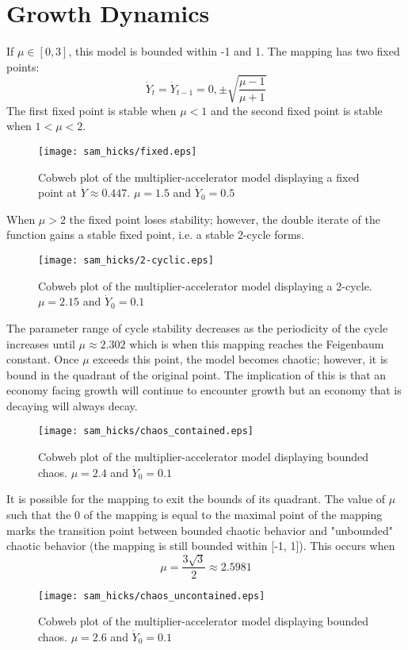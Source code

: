 \section{Growth Dynamics}
If $\mu\in[0,3]$, this model is bounded within -1 and 1. The mapping has two fixed points:
\begin{equation}
    \dot Y_t=\dot Y_{t-1}=0,\pm\sqrt{\frac{\mu-1}{\mu+1}}
\end{equation}
The first fixed point is stable when $\mu<1$ and the second fixed point is stable when $1<\mu<2$.
\begin{figure}
    \centering
    \texttt{[image: sam\_hicks/fixed.eps]}
    \caption{Cobweb plot of the multiplier-accelerator model displaying a fixed point at $\dot Y\approx0.447$. $\mu=1.5$ and $\dot Y_0=0.5$}
    \label{mult_fixed}
\end{figure}

When $\mu>2$ the fixed point loses stability; however, the double iterate of the function gains a stable fixed point, i.e. a stable 2-cycle forms. 

\begin{figure}
    \centering
    \texttt{[image: sam\_hicks/2-cyclic.eps]}
    \caption{Cobweb plot of the multiplier-accelerator model displaying a 2-cycle. $\mu=2.15$ and $\dot Y_0=0.1$}
    \label{mult_2-cycle}
\end{figure}
The parameter range of cycle stability decreases as the periodicity of the cycle increases until $\mu\approx2.302$ which is when this mapping reaches the Feigenbaum constant. Once $\mu$ exceeds this point, the model becomes chaotic; however, it is bound in the quadrant of the original point. The implication of this is that an economy facing growth will continue to encounter growth but an economy that is decaying will always decay.
\begin{figure}
    \centering
    \texttt{[image: sam\_hicks/chaos\_contained.eps]}
    \caption{Cobweb plot of the multiplier-accelerator model displaying bounded chaos. $\mu=2.4$ and $\dot Y_0=0.1$}
    \label{mult_bounded-chaos}
\end{figure}
It is possible for the mapping to exit the bounds of its quadrant. The value of $\mu$ such that the 0 of the mapping is equal to the maximal point of the mapping marks the transition point between bounded chaotic behavior and "unbounded" chaotic behavior (the mapping is still bounded within [-1, 1]). This occurs when 
\begin{equation*}
    \mu=\frac{3\sqrt{3}}{2}\approx2.5981
\end{equation*}
\begin{figure}
    \centering
    \texttt{[image: sam\_hicks/chaos\_uncontained.eps]}
    \caption{Cobweb plot of the multiplier-accelerator model displaying bounded chaos. $\mu=2.6$ and $\dot Y_0=0.1$}
    \label{mult_unbounded-chaos}
\end{figure}

